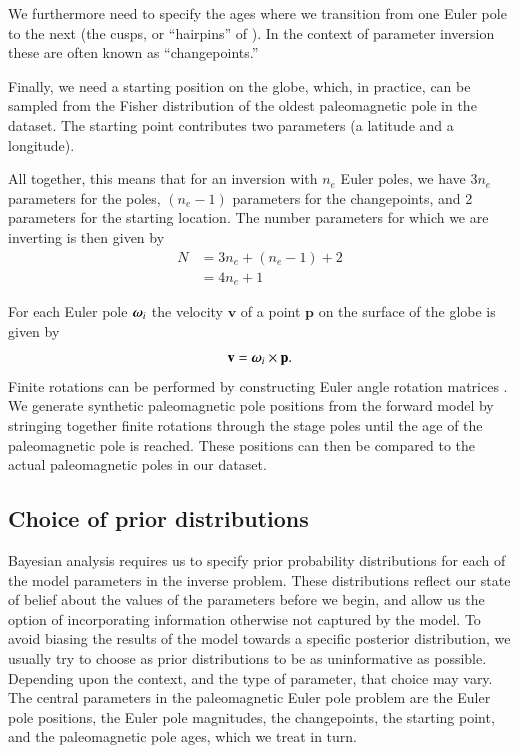 \documentclass[preprint,12pt,authoryear]{elsarticle}
\newcommand{\mitbf}[1]{\hbox{\mathversion{bold}$#1$}}
\begin{document}
We furthermore need to specify the ages where we transition from 
one Euler pole to the next (the cusps, or ``hairpins'' of \citet{irving1972hairpins}).
In the context of parameter inversion these are often known as ``changepoints.''

Finally, we need a starting position on the globe, which, in practice, can be sampled
from the Fisher distribution of the oldest paleomagnetic pole in the dataset.
The starting point contributes two parameters (a latitude and a longitude).

All together, this means that for an inversion with $n_e$ Euler poles, 
we have $3 n_e$ parameters for the poles, $(n_e-1)$ parameters for the changepoints,
and 2 parameters for the starting location.
The number parameters for which we are inverting is then given by
\begin{equation}
\begin{aligned}
N &= 3 n_e + (n_e -1) + 2 \\
 &= 4 n_e + 1
\end{aligned}
\label{eq:n_parameters}
\end{equation}

For each Euler pole $\mitbf{\omega}_i$ the velocity $\mathbf{v}$ of a point 
$\mathbf{p}$ on the surface of the globe is given by
\begin{equation}
\mathbf{v} = \mitbf{\omega}_i \times \mathbf{p}.
\label{eq:rigid_rotation}
\end{equation}
Finite rotations can be performed by constructing Euler angle rotation matrices \citep[cf.][]{goldstein1965classical}. 
We generate synthetic paleomagnetic pole positions from the forward model by stringing together
finite rotations through the stage poles until the age of the paleomagnetic pole
is reached. These positions can then be compared to the actual paleomagnetic poles in our dataset.

\subsection{Choice of prior distributions}
\label{sec:priors}

Bayesian analysis requires us to specify prior probability distributions 
for each of the model parameters in the inverse problem.
These distributions reflect our state of belief about the values of the parameters before we begin,
and allow us the option of incorporating information otherwise not captured by the model.
To avoid biasing the results of the model towards a specific posterior distribution,
we usually try to choose as prior distributions to be as uninformative as possible. 
Depending upon the context, and the type of parameter, that choice may vary.
The central parameters in the paleomagnetic Euler pole problem are the Euler pole positions,
the Euler pole magnitudes, the changepoints, the starting point, and the paleomagnetic pole ages, which we treat in turn.
\end{document}
